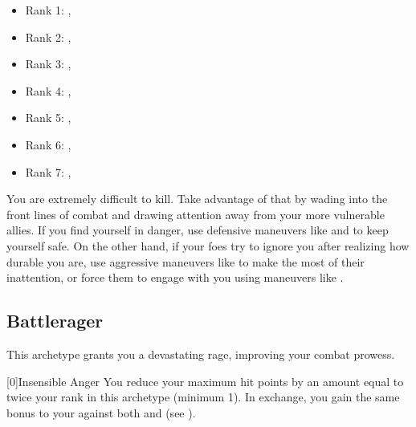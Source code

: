             \begin{itemize}
                \item Rank 1: , 
                \item Rank 2: , 
                \item Rank 3: , 
                \item Rank 4: , 
                \item Rank 5: , 
                \item Rank 6: , 
                \item Rank 7: , 
            \end{itemize}
             You are extremely difficult to kill.
            Take advantage of that by wading into the front lines of combat and drawing attention away from your more vulnerable allies.
            If you find yourself in danger, use defensive maneuvers like  and  to keep yourself safe.
            On the other hand, if your foes try to ignore you after realizing how durable you are, use aggressive maneuvers like  to make the most of their inattention, or force them to engage with you using maneuvers like .

    \newpage
    \subsection{Battlerager}\label{Rage}
        This archetype grants you a devastating rage, improving your combat prowess.

        [0]{Insensible Anger} You reduce your maximum hit points by an amount equal to twice your rank in this archetype (minimum 1).
        In exchange, you gain the same bonus to your  against both  and  (see ).

